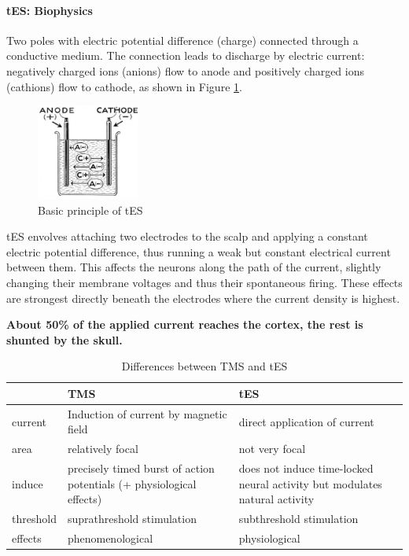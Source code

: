 \documentclass[12pt,article,oneside,a4paper]{memoir}
\begin{document}
\paragraph{tES: Biophysics} Two poles with electric potential difference (charge) connected through a conductive medium. The connection leads to discharge by electric current: negatively charged ions (anions) flow to anode and positively charged ions (cathions) flow to cathode, as shown in Figure \ref{fig:tes}. 

\begin{figure}
  \centering
  \includegraphics[width=0.3\textwidth]{imgs/tes.png}
  \caption{Basic principle of tES}
  \label{fig:tes}
\end{figure}

tES envolves attaching two electrodes to the scalp and applying a constant electric potential difference, thus running a weak but constant electrical current between them. This affects the neurons along the path of the current, slightly changing their membrane voltages and thus their spontaneous firing. These effects are strongest directly beneath the electrodes where the current density is highest.

\textbf{About 50\% of the applied current reaches the cortex, the rest is shunted by the skull.}


\begin{table}[h]
  \begin{tabular}{ l |  p{6cm} |  p{6cm} }
    \hline
     & TMS & tES \\ \hline
    current & Induction of current by magnetic field & direct application of current \\ \hline
    area & relatively focal & not very focal \\ \hline
    induce & precisely timed burst of action potentials (+ physiological effects) & does not induce time-locked neural activity but modulates natural activity \\ \hline
	threshold & suprathreshold stimulation & subthreshold stimulation \\ \hline
    effects & phenomenological & physiological \\
    \hline
  \end{tabular}
  \caption{Differences between TMS and tES}
\end{table}
\end{document}
